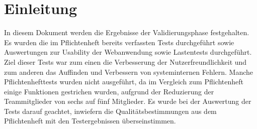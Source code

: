 \chapter{Einleitung}

In diesem Dokument werden die Ergebnisse der Validierungsphase festgehalten.
Es wurden die im Pflichtenheft bereits verfassten Tests durchgeführt sowie Auswertungen zur Usability der Webanwendung 
sowie Lastentests durchgeführt. Ziel dieser Tests war zum einen die Verbesserung der Nutzerfreundlichkeit und zum anderen 
das Auffinden und Verbessern von systeminternen Fehlern.
Manche Pflichtenhefttests wurden nicht ausgeführt, da im Vergleich zum Pflichtenheft einige Funktionen gestrichen wurden, 
aufgrund der Reduzierung der Teammitglieder von sechs auf fünf Mitglieder.
Es wurde bei der Auswertung der Tests darauf geachtet, inwiefern die Qualitätsbestimmungen aus dem Pflichtenheft mit den 
Testergebnissen überseinstimmen.